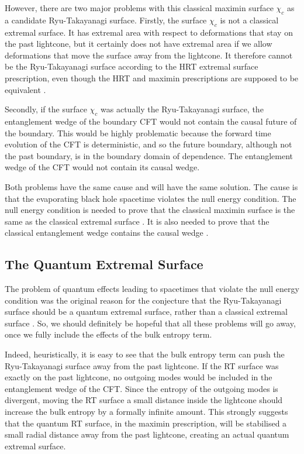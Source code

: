 \documentclass[11pt,a4paper]{article}
\begin{document}
However, there are two major problems with this classical maximin surface $\chi_c$ as a candidate Ryu-Takayanagi surface. 
Firstly, the surface $\chi_c$ is not a classical extremal surface. It has extremal area with respect to deformations that stay on the past lightcone, but it certainly does not have extremal area if we allow deformations that move the surface away from the lightcone. It therefore cannot be the Ryu-Takayanagi surface according to the HRT extremal surface prescription, even though the HRT and maximin prescriptions are supposed to be equivalent \cite{wall2014maximin}.

Secondly, if the surface $\chi_c$ was actually the Ryu-Takayanagi surface, the entanglement wedge of the boundary CFT would not contain the causal future of the boundary. This would be highly problematic because the forward time evolution of the CFT is deterministic, and so the future boundary, although not the past boundary, is in the boundary domain of dependence. The entanglement wedge of the CFT would not contain its causal wedge.

Both problems have the same cause and will have the same solution. The cause is that the evaporating black hole spacetime violates the null energy condition. The null energy condition is needed to prove that the classical maximin surface is the same as the classical extremal surface \cite{wall2014maximin}. It is also needed to prove that the classical entanglement wedge contains the causal wedge \cite{wall2014maximin}.

\subsection{The Quantum Extremal Surface} \label{sec:extremal}
The problem of quantum effects leading to spacetimes that violate the null energy condition was the original reason for the conjecture that the Ryu-Takayanagi surface should be a quantum extremal surface, rather than a classical extremal surface \cite{engelhardt2015quantum}. So, we should definitely be hopeful that all these problems will go away, once we fully include the effects of the bulk entropy term.

Indeed, heuristically, it is easy to see that the bulk entropy term can push the Ryu-Takayanagi surface away from the past lightcone. If the RT surface was exactly on the past lightcone, no outgoing modes would be included in the entanglement wedge of the CFT. Since the entropy of the outgoing modes is divergent, moving the RT surface a small distance inside the lightcone should increase the bulk entropy by a formally infinite amount. This strongly suggests that the quantum RT surface, in the maximin prescription, will be stabilised a small radial distance away from the past lightcone, creating an actual quantum extremal surface.
\end{document}
